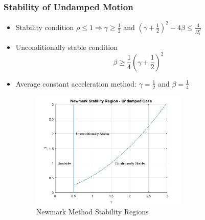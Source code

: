 \documentclass[xcolor=svgnames,9pt]{beamer}
\theoremstyle{remark}
\begin{document}
		\begin{frame}
  			\frametitle{Stability of Undamped Motion}
			\begin{itemize}
				\item Stability condition $\rho \leq 1 \Rightarrow \gamma \geq \frac{1}{2}$ and $(\gamma + \frac{1}{2})^2 - 4\beta \leq \frac{4}{\Omega_i^2}$
				\item Unconditionally stable condition
					\begin{equation}
						\beta \geq \frac{1}{4}\left(\gamma + \frac{1}{2}\right)^2
					\end{equation}
				\item Average constant acceleration method: $\gamma = \frac{1}{2}$ and $\beta = \frac{1}{4}$ 
				\begin{figure}[h!]
   					 \centering
   					 \includegraphics[width=75mm]{GraphNM.jpg}
   					 \caption{Newmark Method Stability Regions}
				            \label{GraphNM}
  				\end{figure}
			\end{itemize}
		\end{frame}
\end{document}
